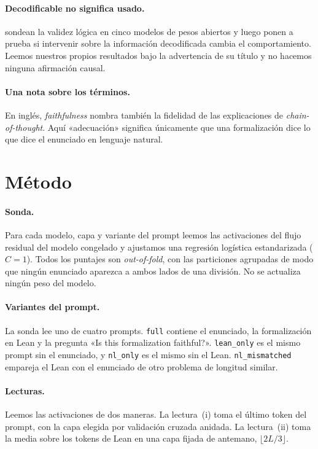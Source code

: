 \documentclass[10pt]{article}
\newcommand{\vr}[1]{\texttt{#1}}
\begin{document}
\paragraph{Decodificable no significa usado.}
\citet{decodability} sondean la validez lógica en cinco modelos de pesos abiertos y luego ponen a prueba si
intervenir sobre la información decodificada cambia el comportamiento. Leemos nuestros propios resultados bajo la
advertencia de su título y no hacemos ninguna afirmación causal.

\paragraph{Una nota sobre los términos.}
En inglés, \emph{faithfulness} nombra también la fidelidad de las explicaciones de \emph{chain-of-thought}. Aquí
«adecuación» significa únicamente que una formalización dice lo que dice el enunciado en lenguaje natural.

\section{Método}

\paragraph{Sonda.}
Para cada modelo, capa y variante del prompt leemos las activaciones del flujo residual del modelo congelado y
ajustamos una regresión logística estandarizada ($C = 1$). Todos los puntajes son \emph{out-of-fold}, con las
particiones agrupadas de modo que ningún enunciado aparezca a ambos lados de una división. No se actualiza ningún
peso del modelo.

\paragraph{Variantes del prompt.}
La sonda lee uno de cuatro prompts. \vr{full} contiene el enunciado, la formalización en Lean y la pregunta
«Is this formalization faithful?». \vr{lean\_only} es el mismo prompt sin el enunciado, y \vr{nl\_only} es el mismo
sin el Lean. \vr{nl\_mismatched} empareja el Lean con el enunciado de otro problema de longitud similar.

\paragraph{Lecturas.}
Leemos las activaciones de dos maneras. La lectura~(i) toma el último token del prompt, con la capa elegida por
validación cruzada anidada. La lectura~(ii) toma la media sobre los tokens de Lean en una capa fijada de antemano,
$\lfloor 2L/3 \rfloor$.
\end{document}
